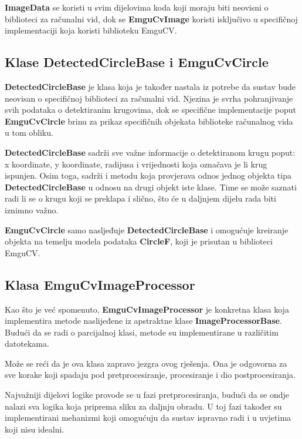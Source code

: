 \documentclass{foi}
\begin{document}
\textbf{ImageData} se koristi u svim dijelovima koda koji moraju biti neovisni o biblioteci za računalni vid, dok se \textbf{EmguCvImage} koristi isključivo u specifičnoj implementaciji koja koristi biblioteku EmguCV.

\subsection{Klase DetectedCircleBase i EmguCvCircle}

\textbf{DetectedCircleBase} je klasa koja je također nastala iz potrebe da sustav bude neovisan o specifičnoj biblioteci za računalni vid. Njezina je svrha pohranjivanje svih podataka o detektiranim krugovima, dok se specifične implementacije poput \textbf{EmguCvCircle} brinu za prikaz specifičnih objekata biblioteke računalnog vida u tom obliku.

\textbf{DetectedCircleBase} sadrži sve važne informacije o detektiranom krugu poput: x koordinate, y koordinate, radijusa i vrijednosti koja označava je li krug ispunjen. Osim toga, sadrži i metodu koja provjerava odnos jednog objekta tipa \textbf{DetectedCircleBase} u odnosu na drugi objekt iste klase. Time se može saznati radi li se o krugu koji se preklapa i slično, što će u daljnjem dijelu rada biti iznimno važno.

\textbf{EmguCvCircle} samo nasljeđuje \textbf{DetectedCircleBase} i omogućuje kreiranje objekta na temelju modela podataka \textbf{CircleF}, koji je prisutan u biblioteci EmguCV.


\subsection{Klasa EmguCvImageProcessor}

Kao što je već spomenuto, \textbf{EmguCvImageProcessor} je konkretna klasa koja implementira metode naslijeđene iz apstraktne klase \textbf{ImageProcessorBase}. Budući da se radi o parcijalnoj klasi, metode su implementirane u različitim datotekama.

Može se reći da je ova klasa zapravo jezgra ovog rješenja. Ona je odgovorna za sve korake koji spadaju pod pretprocesiranje, procesiranje i dio postprocesiranja.

Najvažniji dijelovi logike provode se u fazi pretprocesiranja, budući da se ondje nalazi sva logika koja priprema sliku za daljnju obradu. U toj fazi također su implementirani mehanizmi koji omogućuju da sustav ispravno radi i u uvjetima koji nisu idealni.
\end{document}
